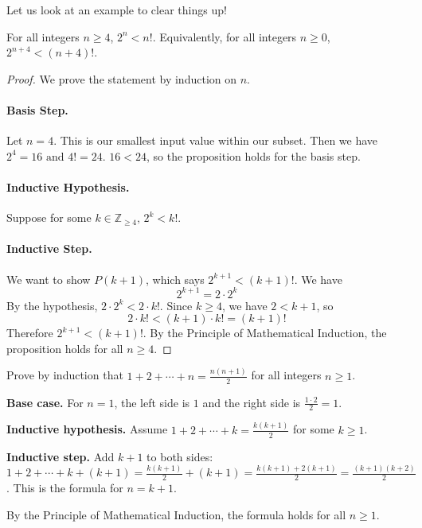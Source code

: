Let us look at an example to clear things up!
\begin{theorem}
    For all integers $n \ge 4$, $2^n < n!$. Equivalently, for all integers $n \ge 0$, $2^{n+4} < (n+4)!$.
\end{theorem}
\begin{proof}

    We prove the statement by induction on $n$.

    \paragraph{Basis Step.}
    Let $n=4$. This is our smallest input value within our subset. Then we have $2^4 = 16 \text{ and } 4! = 24$. $16 < 24$, so the proposition holds for the basis step.
    \paragraph{Inductive Hypothesis.}
    Suppose for some $k\in \mathbb{Z}_{\ge 4},\, 2^k < k!$.
    \paragraph{Inductive Step.}
    We want to show $P(k+1)$, which says $2^{k+1} < (k+1)!$. We have $$2^{k+1} = 2 \cdot 2^k$$ By the hypothesis, $2 \cdot 2^k < 2 \cdot k!$. Since $k \ge 4$, we have $2 < k+1$, so $$2 \cdot k! < (k+1) \cdot k! = (k+1)!$$ Therefore $2^{k+1} < (k+1)!$. By the Principle of Mathematical Induction, the proposition holds for all $n \ge 4$.
\end{proof}


\begin{Exercise}[title={Sum of the First n Integers}, label=proof_sum]
Prove by induction that $1 + 2 + \cdots + n = \frac{n(n+1)}{2}$ for all integers $n \ge 1$.
\end{Exercise}
\begin{Answer}[ref=proof_sum]
\textbf{Base case.} For $n = 1$, the left side is $1$ and the right side is $\frac{1 \cdot 2}{2} = 1$.

\textbf{Inductive hypothesis.} Assume $1 + 2 + \cdots + k = \frac{k(k+1)}{2}$ for some $k \ge 1$.

\textbf{Inductive step.} Add $k+1$ to both sides: $1 + 2 + \cdots + k + (k+1) = \frac{k(k+1)}{2} + (k+1) = \frac{k(k+1) + 2(k+1)}{2} = \frac{(k+1)(k+2)}{2}$. This is the formula for $n = k+1$.

By the Principle of Mathematical Induction, the formula holds for all $n \ge 1$.
\end{Answer}

